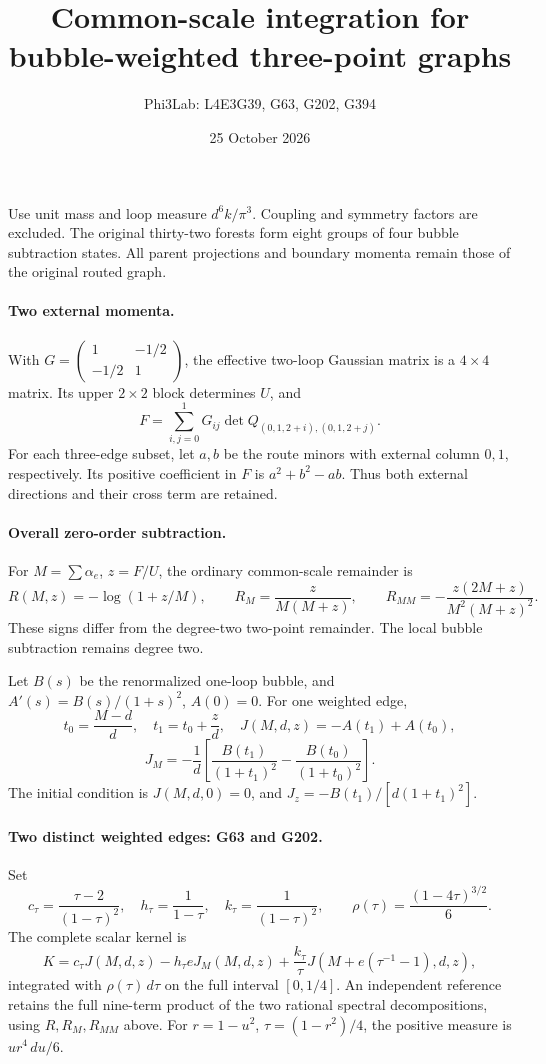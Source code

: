 \documentclass[11pt]{article}
\title{Common-scale integration for bubble-weighted three-point graphs}
\author{Phi3Lab: L4E3G39, G63, G202, G394}
\date{25 October 2026}
\begin{document}
\maketitle
Use unit mass and loop measure \(d^6k/\pi^3\). Coupling and symmetry factors are excluded. The original thirty-two forests form eight groups of four bubble subtraction states. All parent projections and boundary momenta remain those of the original routed graph.

\paragraph{Two external momenta.}
With \(G=\left(\begin{smallmatrix}1&-1/2\\-1/2&1\end{smallmatrix}\right)\), the effective two-loop Gaussian matrix is a \(4\times4\) matrix. Its upper \(2\times2\) block determines \(U\), and
\[
 F=\sum_{i,j=0}^1G_{ij}\det Q_{(0,1,2+i),(0,1,2+j)}.
\]
For each three-edge subset, let \(a,b\) be the route minors with external column \(0,1\), respectively. Its positive coefficient in \(F\) is \(a^2+b^2-ab\). Thus both external directions and their cross term are retained.

\paragraph{Overall zero-order subtraction.}
For \(M=\sum\alpha_e\), \(z=F/U\), the ordinary common-scale remainder is
\[
 R(M,z)=-\log(1+z/M),\qquad
 R_M=\frac{z}{M(M+z)},\qquad
 R_{MM}=-\frac{z(2M+z)}{M^2(M+z)^2}.
\]
These signs differ from the degree-two two-point remainder. The local bubble subtraction remains degree two.

Let \(B(s)\) be the renormalized one-loop bubble, and \(A'(s)=B(s)/(1+s)^2\), \(A(0)=0\). For one weighted edge,
\[
 t_0=\frac{M-d}{d},\quad t_1=t_0+\frac zd,\quad
 J(M,d,z)=-A(t_1)+A(t_0),
\]
\[
 J_M=-\frac1d\left[\frac{B(t_1)}{(1+t_1)^2}
                        -\frac{B(t_0)}{(1+t_0)^2}\right].
\]
The initial condition is \(J(M,d,0)=0\), and
\(J_z=-B(t_1)/[d(1+t_1)^2]\).

\paragraph{Two distinct weighted edges: G63 and G202.}
Set
\[
 c_\tau=\frac{\tau-2}{(1-\tau)^2},\quad
 h_\tau=\frac1{1-\tau},\quad
 k_\tau=\frac1{(1-\tau)^2},\qquad
 \rho(\tau)=\frac{(1-4\tau)^{3/2}}6 .
\]
The complete scalar kernel is
\[
 K=c_\tau J(M,d,z)-h_\tau e J_M(M,d,z)
 +\frac{k_\tau}{\tau}J(M+e(\tau^{-1}-1),d,z),
\]
integrated with \(\rho(\tau)\,d\tau\) on the full interval \([0,1/4]\).
An independent reference retains the full nine-term product of the two rational spectral decompositions, using \(R,R_M,R_{MM}\) above.
For \(r=1-u^2\), \(\tau=(1-r^2)/4\), the positive measure is
\(u r^4\,du/6\).
\end{document}
